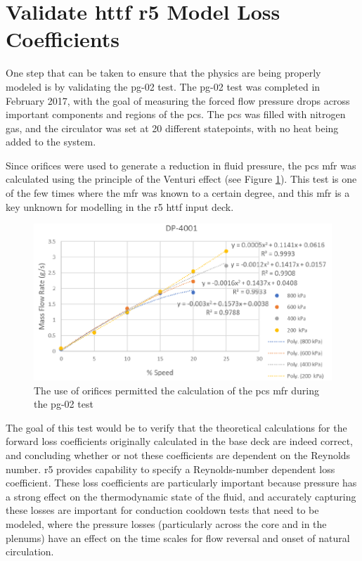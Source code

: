 \documentclass[double,12pt]{beavtex}
\begin{document}
\section{Validate \acrshort{httf} \acrshort{r5} Model Loss Coefficients}

One step that can be taken to ensure that the physics are being properly modeled is by validating the \acrshort{pg}-02 test. The \acrshort{pg}-02 test was completed in February 2017, with the goal of measuring the forced flow pressure drops across important components and regions of the \acrshort{pcs}. The \acrshort{pcs} was filled with nitrogen gas, and the circulator was set at 20 different statepoints, with no heat being added to the system. 

Since orifices were used to generate a reduction in fluid pressure, the \acrshort{pcs} \acrshort{mfr} was calculated using the principle of the Venturi effect (see Figure \ref{fig:PG02_Flow_Rates}). This test is one of the few times where the \acrshort{mfr} was known to a certain degree, and this \acrshort{mfr} is a key unknown for modelling in the \acrshort{r5} \acrshort{httf} input deck. 

\begin{figure}
    \begin{center}
    	\includegraphics[width=12cm]{Figures/PG02_Flow_Rates.PNG}
    	\caption{The use of orifices permitted the calculation of the \acrshort{pcs} \acrshort{mfr} during the \acrshort{pg}-02 test}
    	\label{fig:PG02_Flow_Rates}
    	\end{center}
\end{figure}

The goal of this test would be to verify that the theoretical calculations for the forward loss coefficients originally calculated in the base deck are indeed correct, and concluding whether or not these coefficients are dependent on the Reynolds number. \acrshort{r5} provides capability to specify a Reynolds-number dependent loss coefficient.  These loss coefficients are particularly important because pressure has a strong effect on the thermodynamic state of the fluid, and accurately capturing these losses are important for conduction cooldown tests that need to be modeled, where the pressure losses (particularly across the core and in the plenums) have an effect on the time scales for flow reversal and onset of natural circulation. 
\end{document}
